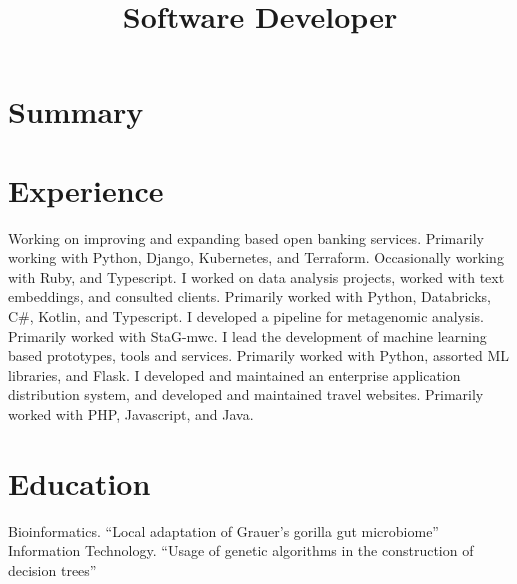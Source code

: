 \documentclass[11pt,a4paper,sans]{moderncv}
\title{Software Developer}
\begin{document}
\makecvtitle

\section{Summary}

\section{Experience}
{}{Working on improving and expanding based open banking services. \newline Primarily working with Python, Django, Kubernetes, and Terraform. Occasionally working with Ruby, and Typescript.}
{}{I worked on data analysis projects, worked with text embeddings, and consulted clients. \newline Primarily worked with Python, Databricks, C\#, Kotlin, and Typescript.}
{}{I developed a pipeline for metagenomic analysis. \newline Primarily worked with StaG-mwc.}
{}{I lead the development of machine learning based prototypes, tools and services. \newline Primarily worked with Python, assorted ML libraries, and Flask.}
{}{I developed and maintained an enterprise application distribution system, and developed and maintained travel websites. \newline Primarily worked with PHP, Javascript, and Java.}

\section{Education}
{}{Bioinformatics. \newline “Local adaptation of Grauer’s gorilla gut microbiome”}
{}{Information Technology. \newline “Usage of genetic algorithms in the construction of decision trees”}
\end{document}
